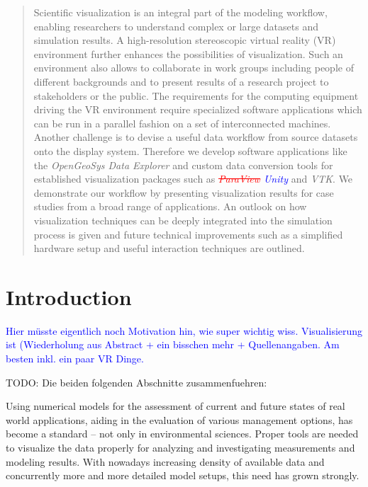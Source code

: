 \documentclass[twocolumn]{svjour3}          %
\newcommand{\myedit}[2]{\textcolor{red}{\st{#1}} \textcolor{blue}{#2}}
\begin{document}
\date{Received: date / Accepted: date}


\maketitle

\begin{abstract}
Scientific visualization is an integral part of the modeling workflow, enabling researchers to understand complex or large datasets and simulation results. A high-resolution stereoscopic virtual reality (VR) environment further enhances the possibilities of visualization. Such an environment also allows to collaborate in work groups including people of different backgrounds and to present results of a research project to stakeholders or the public. The requirements for the computing equipment driving the VR environment require specialized software applications which can be run in a parallel fashion on a set of interconnected machines. Another challenge is to devise a useful data workflow from source datasets onto the display system. Therefore we develop software applications like the \emph{OpenGeoSys Data Explorer} and custom data conversion tools for established visualization packages such as \emph{\myedit{ParaView}{Unity}} and \emph{VTK}. We demonstrate our workflow by presenting visualization results for case studies from a broad range of applications. An outlook on how visualization techniques can be deeply integrated into the simulation process is given and future technical improvements such as a simplified hardware setup and useful interaction techniques are outlined.

\end{abstract}


\section{Introduction}
\label{introduction}

\myedit{}{Hier m\"usste eigentlich noch Motivation hin, wie super wichtig wiss. Visualisierung ist (Wiederholung aus Abstract + ein bisschen mehr + Quellenangaben. Am besten inkl. ein paar VR Dinge.}

TODO: Die beiden folgenden Abschnitte zusammenfuehren:

Using numerical models for the assessment of current and future states of real world applications, aiding in the evaluation of various management options, has become a standard -- not only in environmental sciences. Proper tools are needed to visualize the data properly for analyzing and investigating measurements and modeling results. With nowadays increasing density of available data and concurrently more and more detailed model setups, this need has grown strongly.
\end{document}
